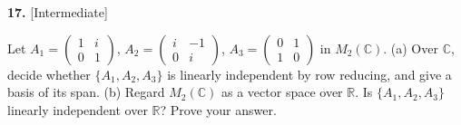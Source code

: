 \documentclass[11pt]{article}
\begin{document}
\begin{minipage}{\linewidth}\textbf{17.} \hfill{\scriptsize\color{ink}[Intermediate]}\par\nopagebreak Let $A_1=\begin{pmatrix}1&i\\0&1\end{pmatrix}$, $A_2=\begin{pmatrix}i&-1\\0&i\end{pmatrix}$, $A_3=\begin{pmatrix}0&1\\1&0\end{pmatrix}$ in $M_2(\mathbb{C})$. (a) Over $\mathbb{C}$, decide whether $\{A_1,A_2,A_3\}$ is linearly independent by row reducing, and give a basis of its span. (b) Regard $M_2(\mathbb{C})$ as a vector space over $\mathbb{R}$. Is $\{A_1,A_2,A_3\}$ linearly independent over $\mathbb{R}$? Prove your answer.
\end{minipage}\par\nopagebreak
\end{document}
